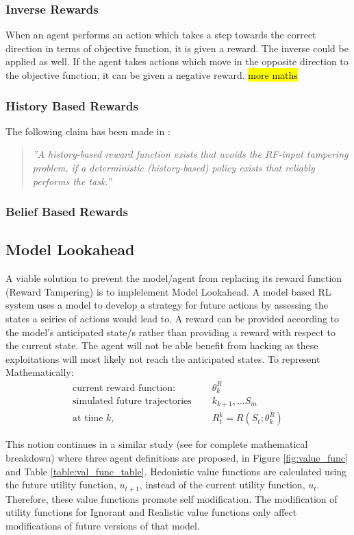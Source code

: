 \documentclass[a4paper,12pt]{report}
\begin{document}
\subsubsection{Inverse Rewards}
When an agent performs an action which takes a step towards the correct direction in terms of objective function, it is given a reward.
The inverse could be applied as well. If the agent takes actions which move in the opposite direction to the objective function, it can be given a negative reward.
\hl{more maths}

\subsubsection{History Based Rewards}
The following claim has been made in \cite{DBLP:journals/corr/abs-1908-04734}:
\begin{quote}
    \emph{''A history-based reward function exists that avoids the RF-input tampering
    problem, if a deterministic (history-based) policy exists that reliably performs the task.''}
\end{quote}

\subsubsection{Belief Based Rewards}

\subsection{Model Lookahead}
A viable solution to prevent the model/agent from replacing its reward function (Reward Tampering) is to implelement Model Lookahead.
A model based RL system uses a model to develop a strategy for future actions by assessing the states a seiries of actions would lead to.
A reward can be provided according to the model's anticipated state/s rather than providing a reward with respect to the current state.
The agent will not be able benefit from hacking as these exploitations will most likely not reach the anticipated states.
To represent Mathematically:
\begin{align*}
    \text{current reward function: } &\quad\theta^R_k \\
    \text{simulated future trajectories } &\quad  k_{k+1},... S_m  \\
    \text{at time } k, &\quad  R_t^k = R(S_t;\theta^R_k)
\end{align*}
    
This notion continues in a similar study (see for complete mathematical breakdown) \cite{EverittFDH16} where three agent definitions are proposed, in Figure \ref{fig:value_func} and Table \ref{table:val_func_table}.
Hedonistic value functions are calculated using the future utility function, $u_{t+1}$, instead of the current utility function, $u_t$.
Therefore, these value functions promote self modification.
The modification of utility functions for Ignorant and Realistic value functions only affect modifications of future versions of that model.
\end{document}

